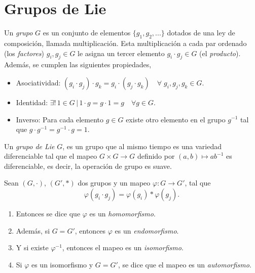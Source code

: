 
\section{Grupos de Lie}

\begin{mydef}[Grupo]
Un \emph{grupo} $G$ es un conjunto de elementos $\{g_{1}, g_{2}, ...\}$ dotados de una ley de composici\'{o}n, llamada multiplicaci\'{o}n. Esta multiplicaci\'{o}n a cada par ordenado (los \emph{factores}) $g_{i}, g_{j} \in G$  le asigna un tercer elemento $g_{i} \cdot g_{j} \in G$ (el \emph{producto}). Adem\'{a}s, se cumplen las siguientes propiedades,
%
\begin{itemize}
\item{Asociatividad: $(g_{i} \cdot g_{j}) \cdot g_{k} = g_{i} \cdot (g_{j} \cdot g_{k}) \quad \forall \; g_{i}, g_{j}, g_{k} \in G$.}
\item{Identidad: $\exists! \, 1 \in G \, \vert \, 1 \cdot g = g \cdot 1 = g \quad \forall g \in G$.}
\item{Inverso: Para cada elemento $g \in G$ existe otro elemento en el grupo $g^{-1}$ tal que $g \cdot g^{-1} = g^{-1} \cdot g = 1$.}
\end{itemize}
%
\end{mydef}

\begin{mydef}  \cite{Warner}
Un \emph{grupo de Lie} $G$, es un grupo que al mismo tiempo es una variedad diferenciable tal que el mapeo $G \times G \rightarrow G$ definido por $(a, b) \mapsto a b^{-1}$ es diferenciable, es decir, la operaci\'{o}n de grupo es suave.
\end{mydef}

\begin{mydef} \cite{Warner}
Sean $(G, \cdot)$, $(G', \ast)$ dos grupos y un mapeo $\varphi: G \longrightarrow G'$, tal que $$\varphi(g_{i} \cdot g_{j}) = \varphi(g_{i}) \ast \varphi(g_{j}).$$
%
\begin{enumerate}
\item{Entonces se dice que $\varphi$ es un \emph{homomorfismo}.}
\item{Adem\'{a}s, si $G = G'$, entonces $\varphi$ es un \emph{endomorfismo}.}
\item{Y si existe $\varphi^{-1}$, entonces el mapeo es un \emph{isomorfismo}.}
\item{Si $\varphi$ es un isomorfismo y $G=G'$, se dice que el mapeo es un \emph{automorfismo}.}
\end{enumerate}
%
\end{mydef}

